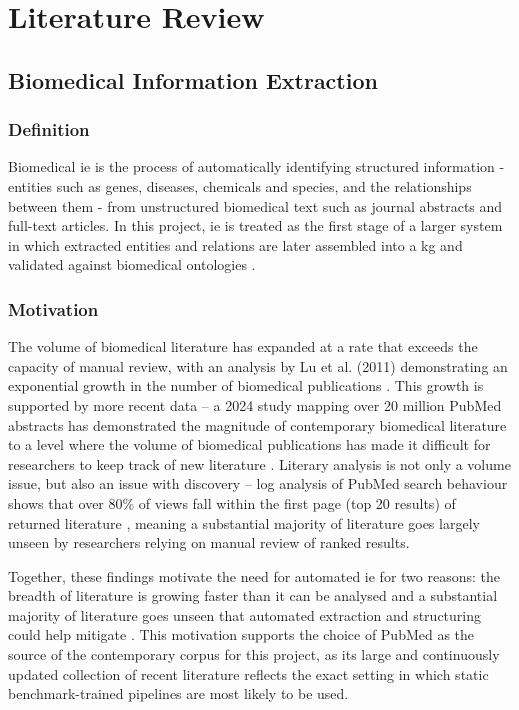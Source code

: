 \chapter{Literature Review}
\label{chap:lit_review}

\section{Biomedical Information Extraction}
\label{sec:lit:biomedical_ie}

\subsection{Definition}
\label{subsec:lit:definition}
Biomedical \gls{ie} is the process of automatically identifying structured information - entities such as genes, diseases, chemicals and species, and the relationships between them - from unstructured biomedical text such as journal abstracts and full-text articles. In this project, \gls{ie} is treated as the first stage of a larger system in which extracted entities and relations are later assembled into a \gls{kg} and validated against biomedical ontologies \pref.

\subsection{Motivation}
\label{subsec:lit:motivation}
The volume of biomedical literature has expanded at a rate that exceeds the capacity of manual review, with an analysis by Lu et al. (2011) demonstrating an exponential growth in the number of biomedical publications \cite{lu2011_pubmed_publicationrate}. This growth is supported by more recent data -- a 2024 study mapping over 20 million PubMed abstracts has demonstrated the magnitude of contemporary biomedical literature to a level where the volume of biomedical  publications has made it difficult for researchers to keep track of new literature \cite{gonzalez2024_biomed_landscape}. Literary analysis is not only a volume issue, but also an issue with discovery -- log analysis of PubMed search behaviour shows that over 80\% of views fall within the first page (top 20 results) of returned literature \cite{islamaj2009_firstpage}, meaning a substantial majority of literature goes largely unseen by researchers relying on manual review of ranked results.

Together, these findings motivate the need for automated \gls{ie} for two reasons: the breadth of literature is growing faster than it can be analysed \cite{lu2011_pubmed_publicationrate,gonzalez2024_biomed_landscape} and a substantial majority of literature goes unseen that automated extraction and structuring could help mitigate \cite{islamaj2009_firstpage}. This motivation supports the choice of PubMed as the source of the contemporary corpus for this project, as its large and continuously updated collection of recent literature reflects the exact setting in which static benchmark-trained pipelines are most likely to be used.

